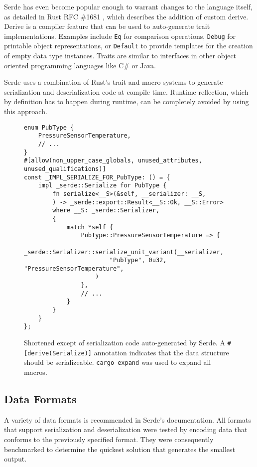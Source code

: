 Serde has even become popular enough to warrant changes to the language itself, as detailed in Rust RFC \#1681 \cite{rfc-1681}, which describes the addition of custom derive. 
Derive is a compiler feature that can be used to auto-generate trait implementations. Examples include \texttt{Eq} for comparison operations, \texttt{Debug} for printable object representations, or \texttt{Default} to provide templates for the creation of empty data type instances. Traits are similar to interfaces in other object oriented programming languages like C\# or Java.

Serde uses a combination of Rust's trait and macro systems to generate serialization and deserialization code at compile time. Runtime reflection, which by definition has to happen during runtime, can be completely avoided by using this approach.

\begin{figure}[H]
\begin{verbatim}
enum PubType {
    PressureSensorTemperature,
    // ...
}
#[allow(non_upper_case_globals, unused_attributes, unused_qualifications)]
const _IMPL_SERIALIZE_FOR_PubType: () = {
    impl _serde::Serialize for PubType {
        fn serialize<__S>(&self, __serializer: __S,
        ) -> _serde::export::Result<__S::Ok, __S::Error>
        where __S: _serde::Serializer,
        {
            match *self {
                PubType::PressureSensorTemperature => {
                    _serde::Serializer::serialize_unit_variant(__serializer,
                        "PubType", 0u32, "PressureSensorTemperature",
                    )
                },
                // ...
            }
        }
    }
};
\end{verbatim}
\caption{Shortened except of serialization code auto-generated by Serde. A \texttt{\#[derive(Serialize)]} annotation indicates that the data structure should be serializeable. \texttt{cargo expand} was used to expand all macros.} 
\end{figure}

\subsection{Data Formats}
A variety of data formats is recommended in Serde's documentation. All formats that support serialization and deserialization were tested by encoding data that conforms to the previously specified format. They were consequently benchmarked to determine the quickest solution that generates the smallest output. 


